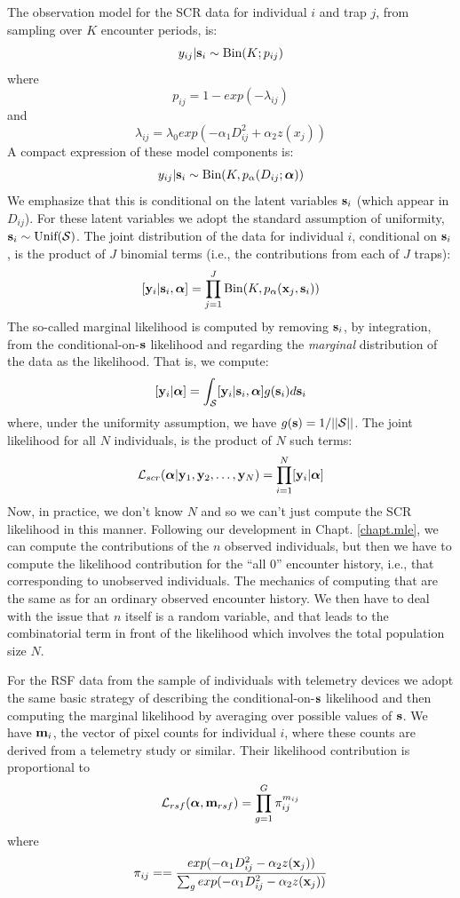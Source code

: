 The observation model for the SCR data for individual $i$ and trap $j$,
from sampling over $K$ encounter periods, is:
\[
 y_{ij}|{\bf s}_{i} \sim \mbox{Bin}(K; p_{ij})
\]
where
\[
 p_{ij} = 1-exp(- \lambda_{ij} )
\]
and
\[
 \lambda_{ij} = \lambda_{0} exp(- \alpha_{1} D_{ij}^{2} + \alpha_{2}  z(x_{j}) )
\]
A compact expression of these model components is:
\begin{equation}
y_{ij}| {\bf s}_{i} \sim \mbox{Bin}(K, p_{\alpha}(D_{ij}; {\bm \alpha}))
\label{rsf.mle.eq.cond-on-s}
\end{equation}
We emphasize that this is conditional on the latent variables ${\bf
  s}_{i}$ (which appear in $D_{ij}$). For these latent variables we
adopt the standard assumption of uniformity, ${\bf s}_{i} \sim
\mbox{Unif}({\cal S})$.  The joint distribution of the data for
individual $i$, conditional on ${\bf s}_{i}$, is the product of $J$
binomial terms (i.e., the contributions from each of $J$ traps):
\[
  [{\bf y}_{i} | {\bf s}_{i} , {\bm \alpha}] =
  \prod_{j=1}^{J} \mbox{Bin}(K, p_{\alpha}({\bf x}_{j},{\bf s}_{i}) )
\]
The so-called marginal likelihood \citep{borchers_efford:2008} is
computed by removing ${\bf s}_{i}$, by integration, from the
conditional-on-${\bf s}$ likelihood and regarding the {\it marginal}
distribution of the data as the likelihood. That is, we compute:
\[
  [{\bf y}_{i}|{\bm \alpha}] =
\int_{{\cal S}}  [ {\bf y}_{i} |{\bf s}_{i},{\bm \alpha}] g({\bf s}_{i}) d{\bf s}_{i}
\]
{\flushleft where}, under the uniformity assumption, we have
$g({\bf s}) = 1/||{\cal S}||$.
The joint likelihood for all $N$ individuals,
is the product of $N$ such terms:
\[
{\cal L}_{scr}({\bm \alpha} | {\bf y}_{1},{\bf y}_{2},\ldots, {\bf y}_{N}) = \prod_{i=1}^{N}
[{\bf y}_{i}|{\bm \alpha}]
\]
Now, in practice, we don't know $N$ and so we can't just compute the
SCR likelihood in this manner. Following our development in
Chapt. \ref{chapt.mle},
we can compute the contributions of the
$n$ observed individuals, but then we have to compute the likelihood
contribution for the ``all 0'' encounter history, i.e., that
corresponding to unobserved individuals. The mechanics of computing
that are the same as for an ordinary observed encounter history. We
then have to deal with the issue that $n$ itself is a random variable,
and that leads to the combinatorial term in front of the likelihood
which involves the total population size $N$.

For the RSF data from the sample of individuals with telemetry devices
we adopt the same basic strategy of describing the
conditional-on-${\bf s}$ likelihood and then computing the marginal
likelihood by averaging over possible values of ${\bf s}$.
We have ${\bf m}_{i}$, the vector of pixel counts for individual $i$,
where these counts are derived from a telemetry study or similar.
Their likelihood contribution is
proportional to
\[
 {\cal L}_{rsf}({\bm \alpha}, {\bf m}_{rsf})
 = \prod_{g=1}^{G}  \pi_{ij} ^{m_{ij}}
\]
where
\[
 \pi_{ij} =  = \frac{ exp( -\alpha_{1} D_{ij}^{2} -\alpha_{2} z({\bf x}_{j}) ) }
{ \sum_{g} exp(-\alpha_{1} D_{ij}^{2} -\alpha_{2} z({\bf x}_{j}))}
\]

